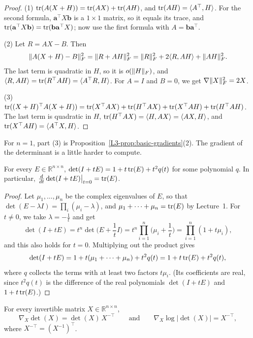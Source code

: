 \begin{proof}
    (1) $\operatorname{tr}(A(X + H)) = \operatorname{tr}(AX) + \operatorname{tr}(AH)$, and $\operatorname{tr}(AH) = \langle A^\top, H \rangle$. For the second formula, $\mathbf{a}^\top X \mathbf{b}$ is a $1 \times 1$ matrix, so it equals its trace, and $\operatorname{tr}(\mathbf{a}^\top X \mathbf{b}) = \operatorname{tr}(\mathbf{b}\mathbf{a}^\top X)$; now use the first formula with $A = \mathbf{b}\mathbf{a}^\top$.

    (2) Let $R = AX - B$. Then
    \[\lVert A(X + H) - B \rVert_F^2 = \lVert R + AH \rVert_F^2 = \lVert R \rVert_F^2 + 2\langle R, AH \rangle + \lVert AH \rVert_F^2.\]
    The last term is quadratic in $H$, so it is $o(\lVert H \rVert_F)$, and $\langle R, AH \rangle = \operatorname{tr}(R^\top A H) = \langle A^\top R, H \rangle$. For $A = I$ and $B = 0$, we get $\nabla \lVert X \rVert_F^2 = 2X$.

    (3) $\operatorname{tr}((X + H)^\top A (X + H)) = \operatorname{tr}(X^\top A X) + \operatorname{tr}(H^\top A X) + \operatorname{tr}(X^\top A H) + \operatorname{tr}(H^\top A H)$. The last term is quadratic in $H$, $\operatorname{tr}(H^\top A X) = \langle H, AX \rangle = \langle AX, H \rangle$, and $\operatorname{tr}(X^\top A H) = \langle A^\top X, H \rangle$.
\end{proof}

For $n = 1$, part (3) is Proposition~\ref{L3-prop:basic-gradients}(2). The gradient of the determinant is a little harder to compute.

\begin{lemma}\label{L3-lem:det-identity}
    For every $E \in \mathbb{R}^{n \times n}$, $\det(I + tE) = 1 + t\operatorname{tr}(E) + t^2 q(t)$ for some polynomial $q$. In particular, $\frac{d}{dt}\det(I + tE)\big|_{t = 0} = \operatorname{tr}(E)$.
\end{lemma}

\begin{proof}
    Let $\mu_1, \ldots, \mu_n$ be the complex eigenvalues of $E$, so that $\det(E - \lambda I) = \prod_i (\mu_i - \lambda)$, and $\mu_1 + \cdots + \mu_n = \operatorname{tr}(E)$ by Lecture~1. For $t \neq 0$, we take $\lambda = -\frac{1}{t}$ and get
    \[\det(I + tE) = t^n \det\Big(E + \frac{1}{t} I\Big) = t^n \prod_{i=1}^n \Big(\mu_i + \frac{1}{t}\Big) = \prod_{i=1}^n (1 + t\mu_i),\]
    and this also holds for $t = 0$. Multiplying out the product gives
    \[\det(I + tE) = 1 + t(\mu_1 + \cdots + \mu_n) + t^2 q(t) = 1 + t\operatorname{tr}(E) + t^2 q(t),\]
    where $q$ collects the terms with at least two factors $t\mu_i$. (Its coefficients are real, since $t^2 q(t)$ is the difference of the real polynomials $\det(I + tE)$ and $1 + t\operatorname{tr}(E)$.)
\end{proof}

\begin{proposition}\label{L3-prop:det-gradient}
    For every invertible matrix $X \in \mathbb{R}^{n \times n}$,
    \[\nabla_X \det(X) = \det(X) \, X^{-\top} \qquad \text{and} \qquad \nabla_X \log|\det(X)| = X^{-\top},\]
    where $X^{-\top} = (X^{-1})^\top$.
\end{proposition}

